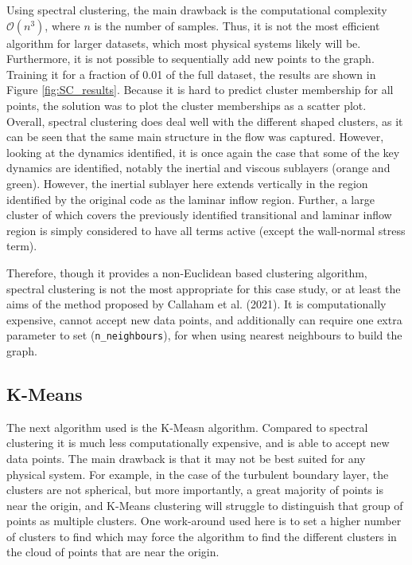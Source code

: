 \documentclass[12pt]{report} %
\begin{document}
Using spectral clustering, the main drawback is the computational complexity $\mathcal{O}(n^3)$, where $n$ is the number of samples. Thus, it is not the most efficient algorithm for larger datasets, which most physical systems likely will be. Furthermore, it is not possible to sequentially add new points to the graph. Training it for a fraction of 0.01 of the full dataset, the results are shown in Figure \ref{fig:SC_results}. Because it is hard to predict cluster membership for all points, the solution was to plot the cluster memberships as a scatter plot. Overall, spectral clustering does deal well with the different shaped clusters, as it can be seen that the same main structure in the flow was captured. However, looking at the dynamics identified, it is once again the case that some of the key dynamics are identified, notably the inertial and viscous sublayers (orange and green). However, the inertial sublayer here extends vertically in the region identified by the original code as the laminar inflow region. Further, a large cluster of which covers the previously identified transitional and laminar inflow region is simply considered to have all terms active (except the wall-normal stress term).

Therefore, though it provides a non-Euclidean based clustering algorithm, spectral clustering is not the most appropriate for this case study, or at least the aims of the method proposed by Callaham et al. (2021)\cite{callaham2021learning}. It is computationally expensive, cannot accept new data points, and additionally can require one extra parameter to set (\texttt{n\_neighbours}), for when using nearest neighbours to build the graph.


\subsection{K-Means}

The next algorithm used is the K-Measn algorithm. Compared to spectral clustering it is much less computationally expensive, and is able to accept new data points. The main drawback is that it may not be best suited for any physical system. For example, in the case of the turbulent boundary layer, the clusters are not spherical, but more importantly, a great majority of points is near the origin, and K-Means clustering will struggle to distinguish that group of points as multiple clusters. One work-around used here is to set a higher number of clusters to find which may force the algorithm to find the different clusters in the cloud of points that are near the origin.
\end{document}
